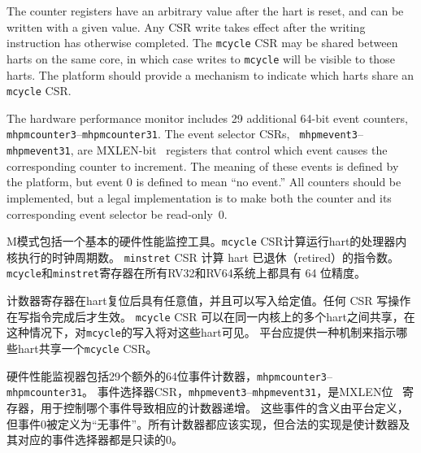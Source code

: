 The counter registers have an arbitrary value after the hart is reset, and
can be written with a given value. Any CSR write takes effect after
the writing instruction has otherwise completed.
The {\tt mcycle} CSR may be shared between harts on the same core, in which
case writes to {\tt mcycle} will be visible to those harts.
The platform should provide a mechanism to indicate which harts share an {\tt
mcycle} CSR.

The hardware performance monitor includes 29 additional 64-bit event counters, {\tt
mhpmcounter3}--{\tt mhpmcounter31}.  The event selector CSRs, {\tt
mhpmevent3}--{\tt mhpmevent31}, are MXLEN-bit \warl\ registers that control which event
causes the corresponding counter to increment.  The meaning of these events is
defined by the platform, but event 0 is defined to mean ``no event.''
All counters should be implemented, but a legal implementation is to make
both the counter and its corresponding event selector be read-only~0.
\fi

M模式包括一个基本的硬件性能监控工具。{\tt mcycle} CSR计算运行hart的处理器内核执行的时钟周期数。 
{\tt minstret} CSR 计算 hart 已退休（retired）的指令数。 
{\tt mcycle}和{\tt minstret}寄存器在所有RV32和RV64系统上都具有 64 位精度。

计数器寄存器在hart复位后具有任意值，并且可以写入给定值。任何 CSR 写操作在写指令完成后才生效。 
{\tt mcycle} CSR 可以在同一内核上的多个hart之间共享，在这种情况下，对{\tt mcycle}的写入将对这些hart可见。 
平台应提供一种机制来指示哪些hart共享一个{\tt mcycle} CSR。

硬件性能监视器包括29个额外的64位事件计数器，{\tt mhpmcounter3}--{\tt mhpmcounter31}。 
事件选择器CSR，{\tt mhpmevent3}--{\tt mhpmevent31}，是MXLEN位 \warl\ 寄存器，用于控制哪个事件导致相应的计数器递增。
这些事件的含义由平台定义，但事件0被定义为“无事件”。所有计数器都应该实现，但合法的实现是使计数器及其对应的事件选择器都是只读的0。


